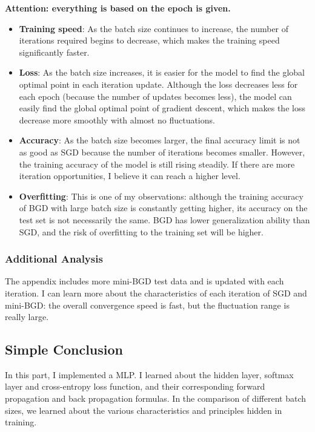 \textbf{Attention: everything is based on the epoch is given.}

\begin{itemize}
    \item \textbf{Training speed}: As the batch size continues to increase, the number of iterations required begins to decrease, which makes the training speed significantly faster.
    \item \textbf{Loss}: As the batch size increases, it is easier for the model to find the global optimal point in each iteration update.
    Although the loss decreases less for each epoch (because the number of updates becomes less), the model can easily find the global optimal point of gradient descent, which makes the loss decrease more smoothly with almost no fluctuations.
    \item \textbf{Accuracy}: As the batch size becomes larger, the final accuracy limit is not as good as SGD because the number of iterations becomes smaller.
    However, the training accuracy of the model is still rising steadily.
    If there are more iteration opportunities, I believe it can reach a higher level.
    \item \textbf{Overfitting}: This is one of my observations: although the training accuracy of BGD with large batch size is constantly getting higher, its accuracy on the test set is not necessarily the same.
    BGD has lower generalization ability than SGD, and the risk of overfitting to the training set will be higher.
\end{itemize}

\subsubsection{Additional Analysis}

The appendix includes more mini-BGD test data and is updated with each iteration.
I can learn more about the characteristics of each iteration of SGD and mini-BGD: the overall convergence speed is fast, but the fluctuation range is really large.

\subsection{Simple Conclusion}

In this part, I implemented a MLP.
I learned about the hidden layer, softmax layer and cross-entropy loss function, and their corresponding forward propagation and back propagation formulas.
In the comparison of different batch sizes, we learned about the various characteristics and principles hidden in training.
